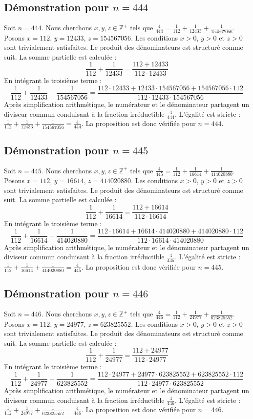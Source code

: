 \documentclass[11pt,a4paper]{article}
\begin{document}
\subsection{Démonstration pour $n = 444$}
Soit $n = 444$. Nous cherchons $x, y, z \in \mathbb{Z}^{+}$ tels que $\frac{4}{444} = \frac{1}{112} + \frac{1}{12433} + \frac{1}{154567056}$.
Posons $x = 112$, $y = 12433$, $z = 154567056$.
Les conditions $x > 0$, $y > 0$ et $z > 0$ sont trivialement satisfaites.
Le produit des dénominateurs est structuré comme suit. La somme partielle est calculée :
$$ \frac{1}{112} + \frac{1}{12433} = \frac{112+12433}{112 \cdot 12433} $$
En intégrant le troisième terme :
$$ \frac{1}{112} + \frac{1}{12433} + \frac{1}{154567056} = \frac{112 \cdot 12433 + 12433 \cdot 154567056 + 154567056 \cdot 112}{112 \cdot 12433 \cdot 154567056} $$
Après simplification arithmétique, le numérateur et le dénominateur partagent un diviseur commun conduisant à la fraction irréductible $\frac{4}{444}$.
L'égalité est stricte : $\frac{1}{112} + \frac{1}{12433} + \frac{1}{154567056} = \frac{4}{444}$.
La proposition est donc vérifiée pour $n = 444$.
\subsection{Démonstration pour $n = 445$}
Soit $n = 445$. Nous cherchons $x, y, z \in \mathbb{Z}^{+}$ tels que $\frac{4}{445} = \frac{1}{112} + \frac{1}{16614} + \frac{1}{414020880}$.
Posons $x = 112$, $y = 16614$, $z = 414020880$.
Les conditions $x > 0$, $y > 0$ et $z > 0$ sont trivialement satisfaites.
Le produit des dénominateurs est structuré comme suit. La somme partielle est calculée :
$$ \frac{1}{112} + \frac{1}{16614} = \frac{112+16614}{112 \cdot 16614} $$
En intégrant le troisième terme :
$$ \frac{1}{112} + \frac{1}{16614} + \frac{1}{414020880} = \frac{112 \cdot 16614 + 16614 \cdot 414020880 + 414020880 \cdot 112}{112 \cdot 16614 \cdot 414020880} $$
Après simplification arithmétique, le numérateur et le dénominateur partagent un diviseur commun conduisant à la fraction irréductible $\frac{4}{445}$.
L'égalité est stricte : $\frac{1}{112} + \frac{1}{16614} + \frac{1}{414020880} = \frac{4}{445}$.
La proposition est donc vérifiée pour $n = 445$.
\subsection{Démonstration pour $n = 446$}
Soit $n = 446$. Nous cherchons $x, y, z \in \mathbb{Z}^{+}$ tels que $\frac{4}{446} = \frac{1}{112} + \frac{1}{24977} + \frac{1}{623825552}$.
Posons $x = 112$, $y = 24977$, $z = 623825552$.
Les conditions $x > 0$, $y > 0$ et $z > 0$ sont trivialement satisfaites.
Le produit des dénominateurs est structuré comme suit. La somme partielle est calculée :
$$ \frac{1}{112} + \frac{1}{24977} = \frac{112+24977}{112 \cdot 24977} $$
En intégrant le troisième terme :
$$ \frac{1}{112} + \frac{1}{24977} + \frac{1}{623825552} = \frac{112 \cdot 24977 + 24977 \cdot 623825552 + 623825552 \cdot 112}{112 \cdot 24977 \cdot 623825552} $$
Après simplification arithmétique, le numérateur et le dénominateur partagent un diviseur commun conduisant à la fraction irréductible $\frac{4}{446}$.
L'égalité est stricte : $\frac{1}{112} + \frac{1}{24977} + \frac{1}{623825552} = \frac{4}{446}$.
La proposition est donc vérifiée pour $n = 446$.
\end{document}
